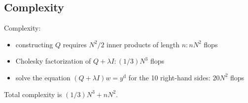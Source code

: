 \subsection{Complexity}

Complexity:

\begin{itemize}
    \item constructing $ Q $ requires $ N^{2} / 2 $ inner products of length $ n: n N^{2} $ flops
    \item Cholesky factorization of $ Q+\lambda I:(1 / 3) N^{3} $ flops
    \item solve the equation $ (Q+\lambda I) w=y^{\mathrm{d}} $ for the 10 right-hand sides: $ 20 N^{2} $ flops
\end{itemize}

Total complexity is $ (1 / 3) N^{3}+n N^{2} $.

